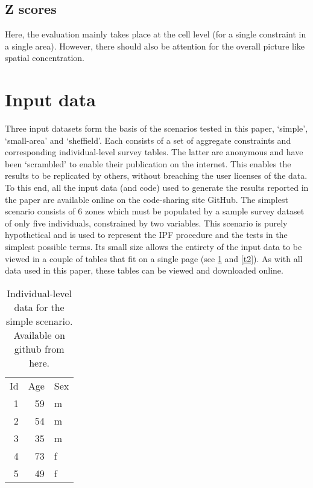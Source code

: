 \documentclass[a4paper,10pt]{article}
\begin{document}
\subsection{Z scores}
Here, the evaluation mainly takes place at the cell level (for a single constraint in a single area).
However, there should also be attention for the overall picture like spatial concentration.


\section{Input data}
Three input datasets form the basis of the scenarios tested in this paper,
`simple', `small-area' and `sheffield'. Each consists of a set of aggregate
constraints and corresponding individual-level survey tables.
The latter are anonymous and have been `scrambled' to enable their
publication on the internet. This enables the results to be replicated by others,
without breaching the user licenses of the data.
To this end, all the input data (and code) used to generate the results reported
in the paper are available online on the code-sharing site GitHub.
The simplest scenario consists of 6 zones which must be populated by a
sample survey dataset of only five individuals, constrained by two variables.
This scenario is purely hypothetical and is used to represent the IPF procedure
and the tests in the simplest possible terms. Its small size allows the entirety
of the input data to be viewed in a couple of tables that fit on a single page
(see \cref{t1} and \cref{t2}). As with all data used in this paper, these tables can be
viewed and downloaded online.

\begin{table}[htbp]
\caption{Individual-level data for the simple scenario. Available on github from here.}
\begin{tabular}{rrl}

\multicolumn{1}{l}{Id} & \multicolumn{1}{l}{Age} & Sex \\
1 & 59 & m \\
2 & 54 & m \\
3 & 35 & m \\
4 & 73 & f \\
5 & 49 & f \\
\end{tabular}
\label{t1}
\end{table}
\end{document}
